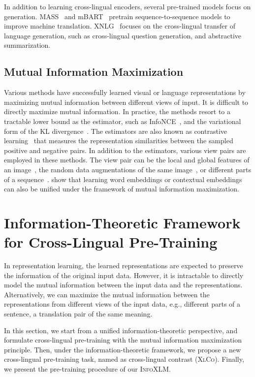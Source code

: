 \documentclass[11pt,a4paper]{article}
\newcommand\our{\textsc{InfoXLM}}
\newcommand\xlco{\textsc{XlCo}}
\begin{document}
In addition to learning cross-lingual encoders, several pre-trained models focus on generation.
MASS~\cite{mass} and mBART~\cite{mbart} pretrain sequence-to-sequence models to improve machine translation.
XNLG~\cite{xnlg} focuses on the cross-lingual transfer of language generation, such as cross-lingual question generation, and abstractive summarization.

\subsection{Mutual Information Maximization}

Various methods have successfully learned visual or language representations by maximizing mutual information between different views of input.
It is difficult to directly maximize mutual information.
In practice, the methods resort to a tractable lower bound as the estimator, such as InfoNCE~\cite{infonce}, and the variational form of the KL divergence~\cite{nwj}.
The estimators are also known as contrastive learning~\cite{Arora2019ATA} that measures the representation similarities between the sampled positive and negative pairs.
In addition to the estimators, various view pairs are employed in these methods.
The view pair can be the local and global features of an image~\cite{infomax,bachman2019learning}, the random data augmentations of the same image~\cite{cmc,moco,simclr}, or different parts of a sequence~\cite{infonce,cpc2,infoword}.
\citet{infoword} show that learning word embeddings or contextual embeddings can also be unified under the framework of mutual information maximization.


\section{Information-Theoretic Framework for Cross-Lingual Pre-Training}

In representation learning, the learned representations are expected to preserve the information of the original input data.
However, it is intractable to directly model the mutual information between the input data and the representations. Alternatively, we can maximize the mutual information between the representations from different views of the input data, e.g., different parts of a sentence, a translation pair of the same meaning.

In this section, we start from a unified information-theoretic perspective, and formulate cross-lingual pre-training with the mutual information maximization principle. Then, under the information-theoretic framework, we propose a new cross-lingual pre-training task, named as cross-lingual contrast (\xlco{}). Finally, we present the pre-training procedure of our \our{}.
\end{document}

